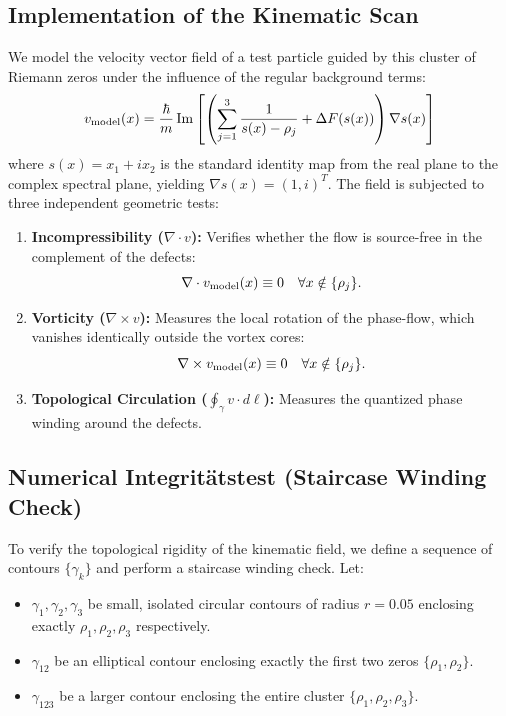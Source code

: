 \documentclass[11pt,a4paper]{article}
\theoremstyle{definition}
\begin{document}
	\subsection{Implementation of the Kinematic Scan}
	We model the velocity vector field of a test particle guided by this cluster of Riemann zeros under the influence of the regular background terms:
	\begin{equation}
		v_{\rm model}(x) = \frac{\hbar}{m} \operatorname{Im} \left[ \left( \sum_{j=1}^{3} \frac{1}{s(x)-\rho_j} + \Delta F(s(x)) \right) \nabla s(x) \right]
	\end{equation}
	where $s(x) = x_1 + i x_2$ is the standard identity map from the real plane to the complex spectral plane, yielding $\nabla s(x) = (1, i)^T$. The field is subjected to three independent geometric tests:
	\begin{enumerate}
		\item \textbf{Incompressibility ($\nabla \cdot v$):} Verifies whether the flow is source-free in the complement of the defects:
		\begin{equation}
			\nabla \cdot v_{\rm model}(x) \equiv 0 \quad \forall x \notin \{\rho_j\}.
		\end{equation}
		\item \textbf{Vorticity ($\nabla \times v$):} Measures the local rotation of the phase-flow, which vanishes identically outside the vortex cores:
		\begin{equation}
			\nabla \times v_{\rm model}(x) \equiv 0 \quad \forall x \notin \{\rho_j\}.
		\end{equation}
		\item \textbf{Topological Circulation ($\oint_\gamma v \cdot d\ell$):} Measures the quantized phase winding around the defects.
	\end{enumerate}
	
	\subsection{Numerical Integrit\"{a}tstest (Staircase Winding Check)}
	To verify the topological rigidity of the kinematic field, we define a sequence of contours $\{\gamma_k\}$ and perform a staircase winding check. Let:
	\begin{itemize}
		\item $\gamma_1, \gamma_2, \gamma_3$ be small, isolated circular contours of radius $r = 0.05$ enclosing exactly $\rho_1, \rho_2, \rho_3$ respectively.
		\item $\gamma_{12}$ be an elliptical contour enclosing exactly the first two zeros $\{\rho_1, \rho_2\}$.
		\item $\gamma_{123}$ be a larger contour enclosing the entire cluster $\{\rho_1, \rho_2, \rho_3\}$.
	\end{itemize}
	
\end{document}
